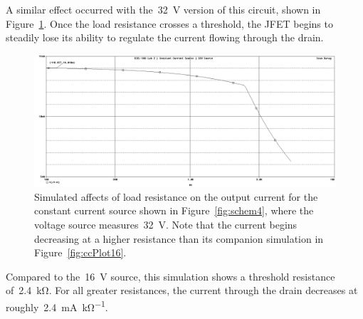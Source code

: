 A similar effect occurred with the~\SI{32}{\volt} version of this circuit,
shown in Figure~\ref{fig:ccPlot32}.  Once the load resistance crosses a
threshold, the JFET begins to steadily lose its ability to regulate the current
flowing through the drain.
%
\begin{figure}[H]
	\centering
	\includegraphics[width=\pwidth]{img/plot/constantCurrent32Plot.PNG}
	\parbox{\pwidth}{
	\caption[PSpice Plot --- Constant Current Source
		(\SI{32}{\volt})]{Simulated affects of load resistance on the output
		current for the constant current source shown in
		Figure~\ref{fig:schem4}, where the voltage source
		measures~\SI{32}{\volt}.  Note that the current begins decreasing at a
		higher resistance than its companion simulation in
		Figure~\ref{fig:ccPlot16}.}
	\label{fig:ccPlot32}}
\end{figure}
%
Compared to the~\SI{16}{\volt} source, this simulation shows a threshold
resistance of~\SI{2.4}{\kilo\ohm}.  For all greater resistances, the current
through the drain decreases at roughly~\SI{2.4}{\milli\ampere\per\kilo\ohm}.

